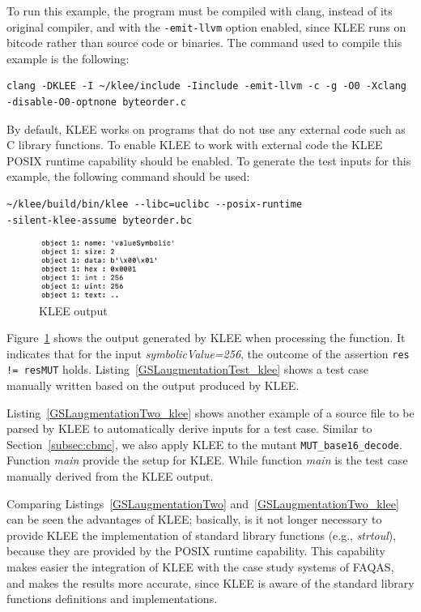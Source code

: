 To run this example, the program must be compiled with clang, instead of its original compiler, and with the \texttt{-emit-llvm} option enabled, since KLEE runs on bitcode rather than source code or binaries. The command used to compile this example is the following:

\begin{verbatim}
clang -DKLEE -I ~/klee/include -Iinclude -emit-llvm -c -g -O0 -Xclang 
-disable-O0-optnone byteorder.c
\end{verbatim}

By default, KLEE works on programs that do not use any external code such as C library functions. To enable KLEE to work with external code the KLEE POSIX runtime capability should be enabled. To generate the test inputs for this example, the following command should be used:

\begin{verbatim}
~/klee/build/bin/klee --libc=uclibc --posix-runtime 
-silent-klee-assume byteorder.bc
\end{verbatim}

\begin{figure}[h]
\begin{center}
\includegraphics[width=0.4\textwidth]{images/klee_output_1}
\caption{KLEE output}
\label{fig:klee_output_1}
\end{center}
\end{figure}



Figure~\ref{fig:klee_output_1} shows the output generated by KLEE when processing the function. It indicates that for the input \emph{symbolicValue=256}, the outcome of the assertion \texttt{res != resMUT} holds. Listing~\ref{GSLaugmentationTest_klee} shows a test case manually written based on the output produced by KLEE.



Listing~\ref{GSLaugmentationTwo_klee} shows another example of a source file to be parsed by KLEE to automatically derive inputs for a test case. Similar to Section~\ref{subsec:cbmc}, we also apply KLEE to the mutant \texttt{MUT\_base16\_decode}. Function \emph{main} provide the setup for KLEE. While function \emph{main} is the test case manually derived from the KLEE output.

Comparing Listings~\ref{GSLaugmentationTwo} and~\ref{GSLaugmentationTwo_klee} can be seen the advantages of KLEE; basically, is it not longer necessary to provide KLEE the implementation of standard library functions (e.g., \emph{strtoul}), because they are provided by the POSIX runtime capability. This capability makes easier the integration of KLEE with the case study systems of FAQAS, and makes the results more accurate, since KLEE is aware of the standard library functions definitions and implementations.

